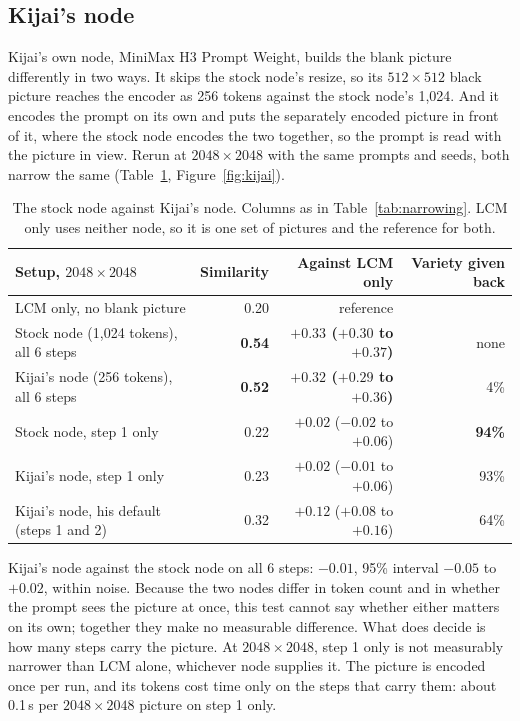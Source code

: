 \documentclass[11pt,a4paper]{article}
\begin{document}
\subsection*{Kijai's node}

Kijai's own node, MiniMax H3 Prompt Weight, builds the blank picture differently in two ways. It skips the stock node's resize, so its $512\times512$ black picture reaches the encoder as 256 tokens against the stock node's 1,024. And it encodes the prompt on its own and puts the separately encoded picture in front of it, where the stock node encodes the two together, so the prompt is read with the picture in view. Rerun at $2048\times2048$ with the same prompts and seeds, both narrow the same (Table~\ref{tab:kijai}, Figure~\ref{fig:kijai}).

\begin{table}[H]
\centering
\small
\begin{tabularx}{\linewidth}{X r r r}
\toprule
Setup, $2048\times2048$ & Similarity & Against LCM only & Variety given back \\
\midrule
LCM only, no blank picture & 0.20 & reference & \\
Stock node (1,024 tokens), all 6 steps & \textbf{0.54} & \textbf{$+0.33$ ($+0.30$ to $+0.37$)} & none \\
Kijai's node (256 tokens), all 6 steps & \textbf{0.52} & \textbf{$+0.32$ ($+0.29$ to $+0.36$)} & 4\% \\
Stock node, step 1 only & 0.22 & $+0.02$ ($-0.02$ to $+0.06$) & \textbf{94\%} \\
Kijai's node, step 1 only & 0.23 & $+0.02$ ($-0.01$ to $+0.06$) & 93\% \\
Kijai's node, his default (steps 1 and 2) & 0.32 & $+0.12$ ($+0.08$ to $+0.16$) & 64\% \\
\bottomrule
\end{tabularx}
\caption{The stock node against Kijai's node. Columns as in Table~\ref{tab:narrowing}. LCM only uses neither node, so it is one set of pictures and the reference for both.}
\label{tab:kijai}
\end{table}

Kijai's node against the stock node on all 6 steps: $-0.01$, 95\% interval $-0.05$ to $+0.02$, within noise. Because the two nodes differ in token count and in whether the prompt sees the picture at once, this test cannot say whether either matters on its own; together they make no measurable difference. What does decide is how many steps carry the picture. At $2048\times2048$, step 1 only is not measurably narrower than LCM alone, whichever node supplies it. The picture is encoded once per run, and its tokens cost time only on the steps that carry them: about 0.1\,s per $2048\times2048$ picture on step 1 only.
\end{document}

